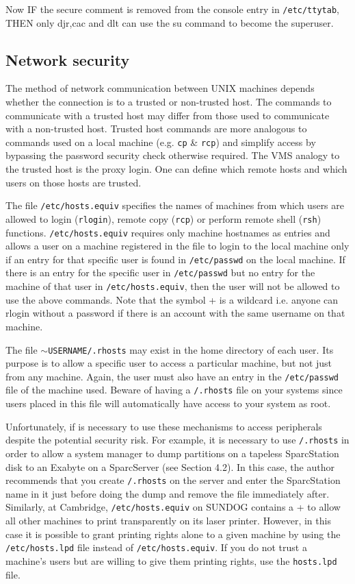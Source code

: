 Now IF the secure comment is removed from the console entry in 
{\tt /etc/ttytab},
THEN only djr,cac and dlt can use the su command to become the superuser.

\subsection{Network security}

The method of network communication between UNIX machines depends whether
the connection is to a trusted or non-trusted host. The commands to 
communicate with a trusted host may differ from those used to communicate with
a non-trusted host. Trusted host commands are more analogous to commands 
used on a local machine (e.g. {\tt cp} \& {\tt rcp}) and simplify access by bypassing the
password security check otherwise required. The VMS analogy to the trusted
host is the proxy login.
One can define which remote hosts and which users on those hosts are trusted.

The file {\tt /etc/hosts.equiv} specifies the names of machines from which users
are allowed to login ({\tt rlogin}), remote copy ({\tt rcp}) or 
perform remote shell ({\tt rsh})
functions. {\tt /etc/hosts.equiv} requires only machine hostnames as entries and
allows a user on a machine registered in the file to login to the local machine  
only if an entry for that specific user is found in {\tt /etc/passwd} on the
local machine. If there is an entry for the specific user in {\tt /etc/passwd} but no
entry for the machine of that user in {\tt /etc/hosts.equiv}, then the user will
not be allowed to use the above commands. 
Note that the symbol + is a wildcard i.e. anyone can rlogin without a password
if there is an account with the same username on that machine.

 
The file $\sim${\tt USERNAME/.rhosts} may exist in the home directory of each user. Its 
purpose is to allow a specific user to access a particular machine, but not
just from any machine. Again, the user must also have an entry in the
{\tt /etc/passwd} file of the machine used. Beware of having  a {\tt /.rhosts} file on your
systems since users placed in this file will automatically have access to
your system as root.



Unfortunately, if is necessary to use these mechanisms to access peripherals
despite the potential security risk. For example, 
it is necessary
to use {\tt /.rhosts} in order to allow a system manager to dump partitions
on a tapeless SparcStation disk to an Exabyte on a SparcServer (see 
Section 4.2).
In this case, the author  recommends that you create
{\tt /.rhosts} on the server and enter the SparcStation name in it just before doing
the dump and remove the file immediately after.
Similarly, at Cambridge, 
{\tt /etc/hosts.equiv} on SUNDOG contains a + to allow all other machines 
to print transparently on its laser printer. However, in this case it is
possible to grant printing rights alone to a given machine by using the
{\tt /etc/hosts.lpd} file instead of {\tt /etc/hosts.equiv}. If you do not trust a 
machine's users but are willing to give them printing rights, use the 
{\tt hosts.lpd}
file.

